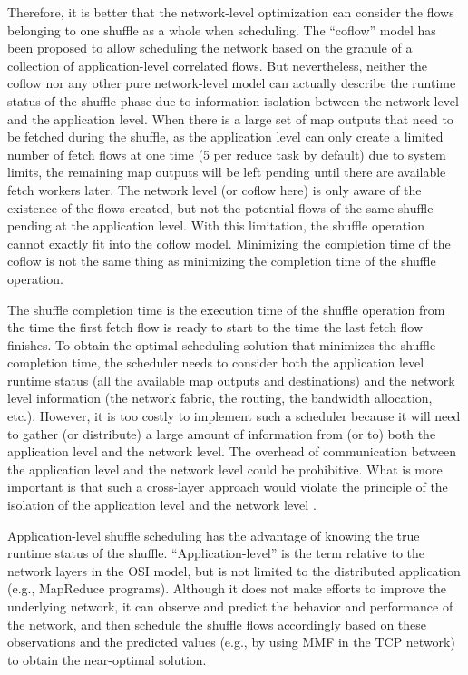 \documentclass[10pt,journal,compsoc]{IEEEtran}
\begin{document}
Therefore, it is better that the network-level optimization can
consider the flows belonging to one shuffle as a whole when
scheduling.
The ``coflow'' model \cite{chowdhury2014efficient,
chowdhury2015efficient} has been proposed to allow scheduling the network based on
the granule of a collection of application-level correlated flows.
But nevertheless, neither the coflow nor any other pure network-level
model can actually describe the runtime status of the shuffle phase
due to information isolation between the network level and the
application level.
When there is a large set of map outputs that need to be fetched during
the shuffle, as the application level can only create a limited number
of fetch flows at one time (5 per reduce task by default)
due to system limits,
the remaining map outputs will be left pending until there are available
fetch workers later. 
The network level (or coflow here) is only aware of the existence of
the flows created, but not the potential flows of the same shuffle
pending at the application level.
With this limitation, the shuffle operation cannot exactly fit into the coflow model. 
Minimizing the completion time of the coflow is not the same thing as
minimizing the completion time of the shuffle operation.



The shuffle completion time is the execution time of the shuffle operation 
from the time the first fetch flow is ready to start to the time the last fetch flow 
finishes. 
To obtain the optimal scheduling solution that minimizes the shuffle
completion time, the scheduler needs to consider both the
application level runtime status (all the available map outputs and
destinations) and the network level information (the network fabric,
the routing, the bandwidth allocation, etc.).
However, it is too costly %
to implement such a scheduler
because it will need to gather (or distribute) a large amount of information
from (or to) both the application level and the network level.
The overhead of communication between the application level and the
network level could be prohibitive.
What is more important is that such a cross-layer approach would violate the
principle of the isolation of the application level and the network
level \cite{saltzer1984end}.

Application-level shuffle scheduling has the advantage of knowing
the true runtime status of the shuffle.
``Application-level'' is the term relative to the network layers in 
the OSI model, but is not limited to the distributed application (e.g., MapReduce programs). 
Although it does not make efforts to improve the underlying network, 
it can observe and predict the behavior and performance of the network, 
and then schedule the shuffle flows accordingly based on
these observations and the predicted values (e.g., by using MMF in the TCP
network) to obtain the near-optimal solution. 
\end{document}
